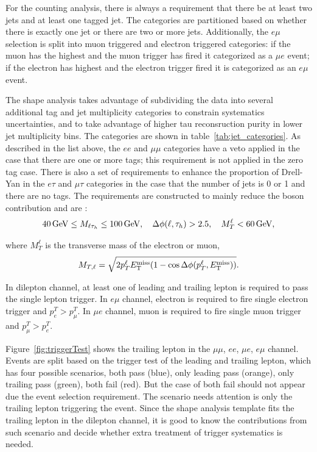 For the counting analysis, there is always a requirement that there be at least two jets and at least one \PQb tagged jet. The categories are partitioned based on whether there is exactly one \PQb jet or there are two or more \PQb jets.  Additionally, the $e\mu$ selection is split into muon triggered and electron triggered categories: if the muon has the highest \pt and the muon trigger has fired it categorized as a $\mu e$ event; if the electron has highest \pt and the electron trigger fired it is categorized as an $e \mu$ event.

The shape analysis takes advantage of subdividing the data into several additional \PQb tag and jet multiplicity categories to constrain systematics uncertainties, and to take advantage of higher tau reconsruction purity in lower jet multiplicity bins.  The categories are shown in table~\ref{tab:jet_categories}.  As described in the list above, the $ee$ and $\mu\mu$ categories have a \PZ veto applied in the case that there are one or more \PQb tags; this requirement is not applied in the zero \PQb tag case.  There is also a set of requirements to enhance the proportion of Drell-Yan in the $e\tau$ and $\mu\tau$ categories in the case that the number of jets is 0 or 1 and there are no \PQb tags.  The requirements are constructed to mainly reduce the \PW boson contribution and are :
\begin{equation*}
    40 \,\text{Ge\hspace{-.08em}V} \leq M_{\ell\tau_{h}} \leq 100 \,\text{Ge\hspace{-.08em}V}, \quad
    \Delta\phi(\ell, \tau_{h}) > 2.5, \quad
    M_{T}^{\ell} < 60 \,\text{Ge\hspace{-.08em}V},
\end{equation*}

\noindent where $M_{T}^{\ell}$ is the transverse mass of the electron or muon,
\begin{equation}
\label{eq:trans_mass}
    M_{T,\ell} = \sqrt{2 p_{T}^{\ell}E_{\mathrm{T}}^{\text{miss}} (1-\cos\Delta\phi(p_{T}^{\ell}, E_{\mathrm{T}}^{\text{miss}}))}.
\end{equation}



In dilepton channel, at least one of leading and trailing lepton is 
required to pass the single lepton trigger.
In $e\mu$ channel, electron is required to fire single electron trigger and $p^T_e>p^T_\mu$.
In $\mu e$ channel, muon is required to fire single muon trigger and $p^T_\mu>p^T_e$.


Figure~\ref{fig:triggerTest} shows the trailing lepton \pt in the $\mu\mu$, $ee$, $\mu e$, $e\mu$ channel.
Events are split based on the trigger test of the leading and trailing lepton, which has four possible
scenarios, both pass (blue), only leading pass (orange), only trailing pass (green), both fail (red).
But the case of both fail should not appear due the event selection requirement. The scenario needs
attention is only the trailing lepton triggering the event. Since the shape analysis template fits the
trailing lepton \pt in the dilepton channel, it is good to know the contributions from such scenario and
decide whether extra treatment of trigger systematics is needed.


